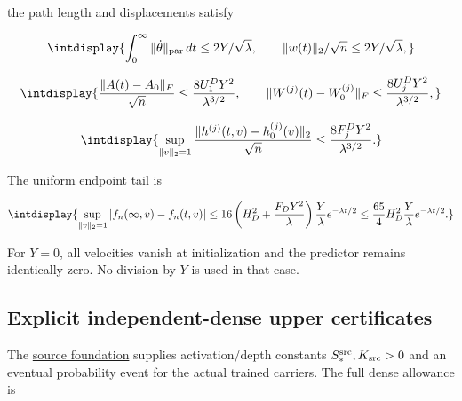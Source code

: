 
the path length and displacements satisfy


\begingroup\renewcommand{\theHequation}{intdisplay.56}
\begin{equation*}
\intdisplay{
\int_0^\infty\|\dot\theta\|_{\rm par}\,dt\le2Y/\sqrt\lambda,
\qquad \|w(t)\|_2/\sqrt n\le2Y/\sqrt\lambda,
}
\end{equation*}
\endgroup

\begingroup\renewcommand{\theHequation}{intdisplay.57}
\begin{equation*}
\intdisplay{
\frac{\|A(t)-A_0\|_F}{\sqrt n}\le\frac{8U_1^DY^2}{\lambda^{3/2}},
\qquad
\|W^{(j)}(t)-W_0^{(j)}\|_F\le\frac{8U_j^DY^2}{\lambda^{3/2}},
}
\end{equation*}
\endgroup

\begingroup\renewcommand{\theHequation}{intdisplay.58}
\begin{equation*}
\intdisplay{
\sup_{\|v\|_2=1}
\frac{\|h^{(j)}(t,v)-h_0^{(j)}(v)\|_2}{\sqrt n}
\le\frac{8F_j^DY^2}{\lambda^{3/2}}.
}
\end{equation*}
\endgroup


The uniform endpoint tail is


\begingroup\renewcommand{\theHequation}{intdisplay.59}
\begin{equation*}
\intdisplay{
\sup_{\|v\|_2=1}|f_n(\infty,v)-f_n(t,v)|
\le16\left(H_D^2+\frac{F_DY^2}{\lambda}\right)
\frac Y\lambda e^{-\lambda t/2}
\le\frac{65}{4}H_D^2\frac Y\lambda e^{-\lambda t/2}.
}
\end{equation*}
\endgroup


For \(Y=0\), all velocities vanish at initialization and the predictor remains identically zero. No division by \(Y\) is used in that case.


\subsection{Explicit independent-dense upper certificates}
\label{int:dense-forward-comparison}


The \hyperref[int:source-foundations]{source foundation} supplies activation/depth constants \(S_*^{\rm src},\allowbreak K_{\rm src}>0\) and an eventual probability event for the actual trained carriers. The full dense allowance is


